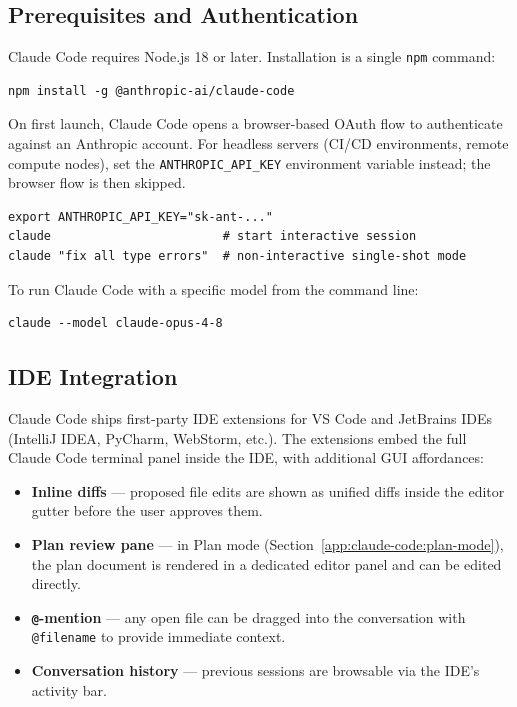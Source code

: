 \subsection{Prerequisites and Authentication}
\label{app:claude-code:install}

Claude Code requires Node.js 18 or later.  Installation is a single
\texttt{npm} command:

\begin{verbatim}
npm install -g @anthropic-ai/claude-code
\end{verbatim}

On first launch, Claude Code opens a browser-based OAuth flow to authenticate
against an Anthropic account.  For headless servers (CI/CD environments, remote
compute nodes), set the \texttt{ANTHROPIC\_API\_KEY} environment variable
instead; the browser flow is then skipped.

\begin{verbatim}
export ANTHROPIC_API_KEY="sk-ant-..."
claude                        # start interactive session
claude "fix all type errors"  # non-interactive single-shot mode
\end{verbatim}

To run Claude Code with a specific model from the command line:

\begin{verbatim}
claude --model claude-opus-4-8
\end{verbatim}

\subsection{IDE Integration}
\label{app:claude-code:ide}

Claude Code ships first-party IDE extensions for VS Code and JetBrains IDEs
(IntelliJ IDEA, PyCharm, WebStorm, etc.).  The extensions embed the full
Claude Code terminal panel inside the IDE, with additional GUI affordances:

\begin{itemize}
  \item \textbf{Inline diffs} --- proposed file edits are shown as unified diffs
        inside the editor gutter before the user approves them.
  \item \textbf{Plan review pane} --- in Plan mode
        (Section~\ref{app:claude-code:plan-mode}), the plan document is
        rendered in a dedicated editor panel and can be edited directly.
  \item \textbf{\texttt{@}-mention} --- any open file can be dragged into the
        conversation with \texttt{@filename} to provide immediate context.
  \item \textbf{Conversation history} --- previous sessions are browsable via
        the IDE's activity bar.
\end{itemize}

